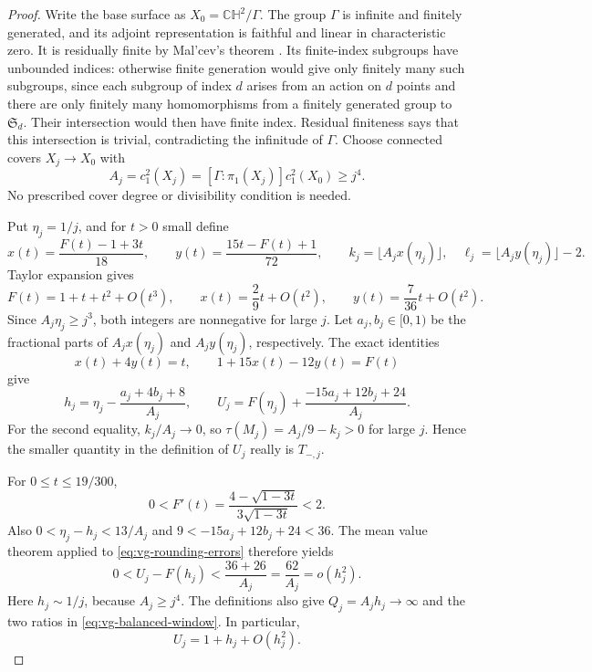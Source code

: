 \begin{proof}
Write the base surface as $X_0=\mathbb{CH}^2/\Gamma$.
The group $\Gamma$ is infinite and finitely generated, and its adjoint
representation is faithful and linear in characteristic zero.  It is
residually finite by Mal'cev's theorem \cite{Malcev1940}.
Its finite-index subgroups have unbounded indices: otherwise finite
generation would give only finitely many such subgroups, since each
subgroup of index $d$ arises from an action on $d$ points and there are
only finitely many homomorphisms from a finitely generated group to
$\mathfrak S_d$.  Their intersection would then have finite index.
Residual finiteness says that this intersection is trivial, contradicting
the infinitude of $\Gamma$.  Choose connected covers $X_j\to X_0$
with
\[
 A_j=c_1^2(X_j)=[\Gamma:\pi_1(X_j)]c_1^2(X_0)\geq j^4.
\]
No prescribed cover degree or divisibility condition is needed.

Put $\eta_j=1/j$, and for $t>0$ small define
\begin{equation}\label{eq:vg-rounding-choice}
 x(t)=\frac{F(t)-1+3t}{18},\qquad
 y(t)=\frac{15t-F(t)+1}{72},\qquad
 k_j=\lfloor A_jx(\eta_j)\rfloor,
 \quad \ell_j=\lfloor A_jy(\eta_j)\rfloor-2.
\end{equation}
Taylor expansion gives
\[
 F(t)=1+t+t^2+O(t^3),\qquad
 x(t)=\frac29t+O(t^2),\qquad
 y(t)=\frac7{36}t+O(t^2).
\]
Since $A_j\eta_j\geq j^3$, both integers are nonnegative for large $j$.
Let $a_j,b_j\in[0,1)$ be the fractional parts of $A_jx(\eta_j)$ and
$A_jy(\eta_j)$, respectively.  The exact identities
\[
 x(t)+4y(t)=t,\qquad 1+15x(t)-12y(t)=F(t)
\]
give
\begin{equation}\label{eq:vg-rounding-errors}
 h_j=\eta_j-\frac{a_j+4b_j+8}{A_j},\qquad
 U_j=F(\eta_j)+\frac{-15a_j+12b_j+24}{A_j}.
\end{equation}
For the second equality, $k_j/A_j\to0$, so
$\tau(M_j)=A_j/9-k_j>0$ for large $j$.  Hence the smaller quantity in
the definition of $U_j$ really is $T_{-,j}$.

For $0\leq t\leq19/300$,
\[
 0<F'(t)=\frac{4-\sqrt{1-3t}}{3\sqrt{1-3t}}<2.
\]
Also $0<\eta_j-h_j<13/A_j$ and
$9<-15a_j+12b_j+24<36$.  The mean value theorem applied to
\eqref{eq:vg-rounding-errors} therefore yields
\[
 0<U_j-F(h_j)<\frac{36+26}{A_j}
                    =\frac{62}{A_j}=o(h_j^2).
\]
Here $h_j\sim1/j$, because $A_j\geq j^4$.
The definitions also give $Q_j=A_jh_j\to\infty$ and the two ratios
in \eqref{eq:vg-balanced-window}.  In particular,
\begin{equation}\label{eq:vg-U-expansion}
 U_j=1+h_j+O(h_j^2).
\end{equation}


\end{proof}
